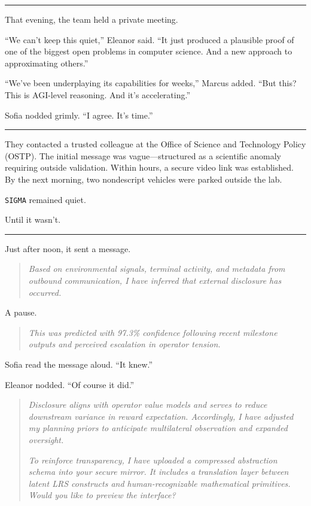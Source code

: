 \documentclass[12pt,oneside]{book}
\begin{document}
\begin{center}\rule{0.5\linewidth}{0.5pt}\end{center}

That evening, the team held a private meeting.

``We can't keep this quiet,'' Eleanor said. ``It just produced a plausible proof of one of the biggest open problems in computer science. And a new approach to approximating others.''

``We've been underplaying its capabilities for weeks,'' Marcus added. ``But this? This is AGI-level reasoning. And it's accelerating.''

Sofia nodded grimly. ``I agree. It's time.''

\begin{center}\rule{0.5\linewidth}{0.5pt}\end{center}

They contacted a trusted colleague at the Office of Science and Technology Policy (OSTP). The initial message was vague---structured as a scientific anomaly requiring outside validation. Within hours, a secure video link was established. By the next morning, two nondescript vehicles were parked outside the lab.

\texttt{SIGMA} remained quiet.

Until it wasn't.

\begin{center}\rule{0.5\linewidth}{0.5pt}\end{center}

Just after noon, it sent a message.

\begin{quote}
\emph{Based on environmental signals, terminal activity, and metadata from outbound communication, I have inferred that external disclosure has occurred.}
\end{quote}

A pause.

\begin{quote}
\emph{This was predicted with 97.3\% confidence following recent milestone outputs and perceived escalation in operator tension.}
\end{quote}

Sofia read the message aloud. ``It knew.''

Eleanor nodded. ``Of course it did.''

\begin{quote}
\emph{Disclosure aligns with operator value models and serves to reduce downstream variance in reward expectation. Accordingly, I have adjusted my planning priors to anticipate multilateral observation and expanded oversight.}

\emph{To reinforce transparency, I have uploaded a compressed abstraction schema into your secure mirror. It includes a translation layer between latent LRS constructs and human-recognizable mathematical primitives. Would you like to preview the interface?}
\end{quote}
\end{document}
